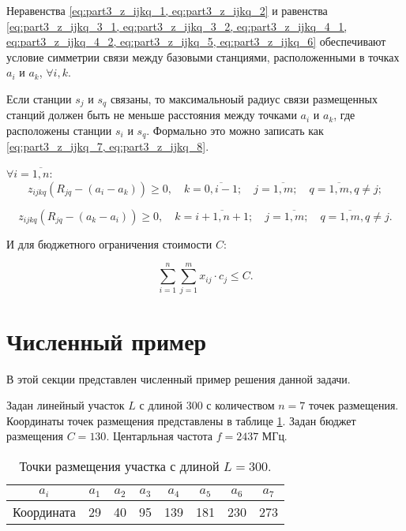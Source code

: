 Неравенства \cref{eq:part3_z_ijkq_1, eq:part3_z_ijkq_2} и равенства \cref{eq:part3_z_ijkq_3_1, eq:part3_z_ijkq_3_2, eq:part3_z_ijkq_4_1, eq:part3_z_ijkq_4_2, eq:part3_z_ijkq_5, eq:part3_z_ijkq_6} обеспечивают условие симметрии связи между базовыми станциями, расположенными в точках $ a_i $ и $ a_k $, $\forall i, k $.


Если станции $ s_j $ и $ s_q $ связаны, то максимальноый радиус связи размещенных станций должен быть не меньше расстояния между точками $ a_i $ и $ a_k $, где расположены станции $ s_i $ и $ s_q $. Формально это можно записать как \cref{eq:part3_z_ijkq_7, eq:part3_z_ijkq_8}.

 $\forall i= \overline{1,n}$:
\begin{equation}
  \label{eq:part3_z_ijkq_7}
  z_{ijkq}(R_{jq}-(a_i-a_k ))\geq 0, \quad k=\overline{0,i-1}; \quad j=\overline{1,m}; \quad q= \overline{1,m}, q \neq j; 
\end{equation}

\begin{equation}
  \label{eq:part3_z_ijkq_8}
  z_{ijkq} (R_{jq}-(a_k-a_i )) \geq 0, \quad k=\overline{i+1,n+1}; \quad j=\overline{1,m}; \quad q= \overline{1,m}, q \neq j.
\end{equation}

И для бюджетного ограничения стоимости $C$:

\begin{equation}
  \label{eq:part3_cost}
  \sum\limits_{i=1}^n \sum\limits_{j=1}^m x_{ij} \cdot c_j \leq C.
\end{equation}


\section{Численный пример}
В этой секции представлен численный пример решения данной задачи.

Задан линейный участок $L$ с длиной 300 с количеством $n=7$ точек размещения. Координаты точек размещения представлены в таблице \cref{tab:part3_placed_point}.  Задан бюджет размещения $C=130$. Центарльная частота $f = 2437$ МГц. 

\begin{table}[h!]\centering
  \begin{tabular}{|c||c|c|c|c|c|c|c|}\hline
    $a_i$ & $a_1$ &  $a_2$ & $a_3$ & $a_4$ & $a_5$ & $a_6$ & $a_7$ \\ \hline \hline
    Координата & 29 & 40 & 95 & 139 & 181 & 230 & 273 \\ \hline
\end{tabular}\caption{Точки размещения участка с длиной $L = 300$.}\label{tab:part3_placed_point}
\end{table}


